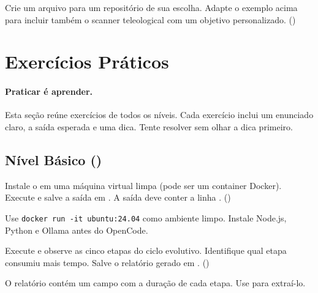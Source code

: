 \begin{exercicio}
Crie um arquivo  para
um repositório de sua escolha. Adapte o exemplo acima para
incluir também o scanner teleological com um objetivo
personalizado. (\nivelavancado)
\end{exercicio}

\section{Exercícios Práticos}
\label{sec:exercicios}
\nivelzero\nivelbasico\nivelintermediario\nivelavancado

\paragraph{Praticar é aprender.} Esta seção reúne exercícios de todos os
níveis. Cada exercício inclui um enunciado claro, a saída esperada e uma
dica. Tente resolver sem olhar a dica primeiro.

\subsection{Nível Básico (\nivelbasico)}
\label{subsec:ex-basico}

\begin{exercicio}
Instale o \opencodeeco{} em uma máquina virtual limpa (pode ser um
container Docker). Execute  e salve a saída
em . A saída deve conter a linha
.
(\nivelzero)

 Use \texttt{docker run -it ubuntu:24.04} como
ambiente limpo. Instale Node.js, Python e Ollama antes do OpenCode.
\end{exercicio}

\begin{exercicio}
Execute  e observe as cinco etapas do ciclo
evolutivo. Identifique qual etapa consumiu mais tempo. Salve o
relatório gerado em .
(\nivelzero)

 O relatório contém um campo  com a
duração de cada etapa. Use  para
extraí-lo.
\end{exercicio}

